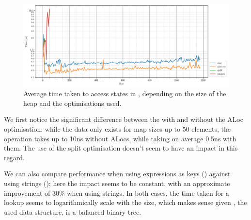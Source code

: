 \begin{figure}
	\centering
	\includegraphics[width=13cm]{figures/pmap_time_per_size.pdf}
	\caption{Average time taken to access states in \PMap, depending on the size of the heap and the optimisations used.}
	\label{fig:pmap-perf}
\end{figure}

We first notice the significant difference between the \PMap{} with and without the ALoc optimisation: while the data only exists for map sizes up to 50 elements, the operation takes up to 10ns without ALocs, while taking on average 0.5ns with them. The use of the split optimisation doesn't seem to have an impact in this regard.

We can also compare performance when using expressions as keys () against using strings (); here the impact seems to be constant, with an approximate improvement of 30\% when using strings. In both cases, the time taken for a lookup seems to logarithmically scale with the size, which makes sense given , the used data structure, is a balanced binary tree.
